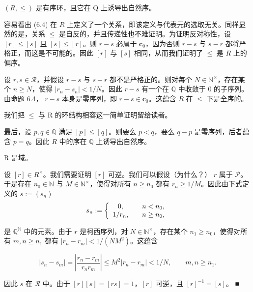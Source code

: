 \begin{lemma}

$  (R, \leq)  $ 是有序环，且它在 Q 上诱导出自然序。

\proofhead
容易看出 (6.4) 在 $R$ 上定义了一个关系，即该定义与代表元的选取无关。同样显然的是，关系 $\leq$ 是自反的，并且传递性也不难证明。为证明反对称性，设 $[r] \leq [s]$ 且 $[s] \leq [r]$。则 $r-s$ 必属于 $\mathbf{c}_0$，因为否则 $r-s$ 与 $s-r$ 都将严格正，而这是不可能的。因此 $[r]$ 与 $[s]$ 相同，从而我们证明了 $\leq$ 是 $R$ 上的偏序。

设  $ r, s \in \mathcal{R} $，并假设  $ r - s $ 与  $ s - r $ 都不是严格正的。则对每个  $ N \in \mathbb{N}^\times $，存在某个  $ n \geq N $，使得  $ |r_n - s_n| < 1/N $。因此  $ r - s $ 有一个在  $ \mathbb{Q} $ 中收敛于 0 的子序列。由命题 6.4， $ r - s $ 本身是零序列，即  $ r - s \in \mathbf{c}_0 $。这蕴含  $ R $ 在  $ \leq $ 下是全序的。

我们把  $ \leq $ 与 R 的环结构相容这一简单证明留给读者。

最后，设  $ p, q \in \mathbb{Q} $ 满足  $ [\overline{p}] \leq [\overline{q}] $。则要么  $ p < q $，要么  $ \overline{q - p} $ 是零序列，后者蕴含  $ p = q $。因此  $ R $ 中的序在  $ \mathbb{Q} $ 上诱导出自然序。
\end{lemma}

\begin{proposition}

R 是域。

\proofhead
设  $ [r] \in R^\times $。我们需要证明  $ [r] $ 可逆。我们可以假设（为什么？） $ r $ 属于  $ \mathcal{P} $。于是存在  $ n_0 \in \mathbb{N} $ 与  $ M \in \mathbb{N}^\times $，使得对所有  $ n \geq n_0 $ 都有  $ r_n \geq 1/M $。因此由下式定义的  $ s := (s_n) $
\begin{equation*}
s_{n}:=\left\{\begin{array}{c l}{0,}&{\quad n<n_{0},}\\ {1/r_{n},}&{\quad n\geq n_{0},}\\ \end{array}\right.
\end{equation*}

是 $\mathbb{Q}^{\mathbb{N}}$ 中的元素。由于 $r$ 是柯西序列，对 $N \in \mathbb{N}^\times$，存在某个 $n_1 \geq n_0$，使得对所有 $m, n \geq n_1$ 都有 $|r_n - r_m| < 1/(NM^2)$。这蕴含

\[
\left|s_{n}-s_{m}\right|=\left|\frac{r_{n}-r_{m}}{r_{n}r_{m}}\right|\leq M^{2}\left|r_{n}-r_{m}\right|<1/N,\qquad m,n\geq n_{1}.
\]

因此 $s$ 在 $\mathcal{R}$ 中。由于 $[r][s]=[rs]=\overline{1}$，$[r]$ 可逆，且 $[r]^{-1}=[s]$。 ■

\end{proposition}

